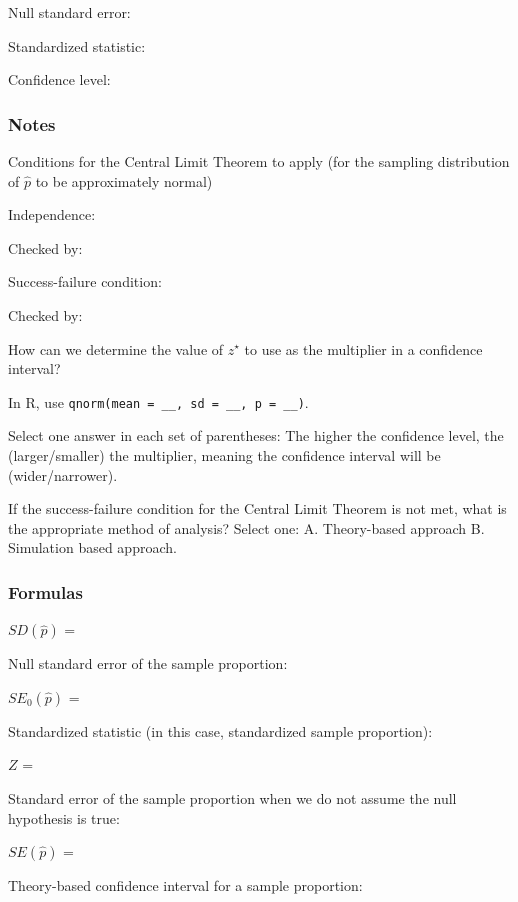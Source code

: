 \documentclass[
]{report}
\newcommand{\rgs}{\vspace{12pt}} %
\newcommand{\rgi}{\hspace{24pt}}  %
\begin{document}
Null standard error:
\rgs

Standardized statistic:
\rgs

Confidence level:
\rgs

\hypertarget{notes-18}{%
\subsubsection*{Notes}\label{notes-18}}

Conditions for the Central Limit Theorem to apply (for the sampling distribution of \(\hat{p}\) to be approximately normal)

\rgi Independence:
\rgs

\rgi \rgi Checked by:
\rgs

\rgi Success-failure condition:
\rgs

\rgi \rgi Checked by:
\rgs

How can we determine the value of \(z^⋆\) to use as the multiplier in a confidence interval?
\rgs

\rgi In R, use \texttt{qnorm(mean\ =\ \_\_,\ sd\ =\ \_\_,\ p\ =\ \_\_)}.

Select one answer in each set of parentheses: The higher the confidence level, the (larger/smaller) the multiplier, meaning the confidence interval will be (wider/narrower).

If the success-failure condition for the Central Limit Theorem is not met, what is the appropriate method of analysis? Select one:
\rgi A. Theory-based approach
\rgi B. Simulation based approach.

\hypertarget{formulas-1}{%
\subsubsection*{Formulas}\label{formulas-1}}

\(SD(\hat{p})\) =
\rgs

Null standard error of the sample proportion:

\(SE_0(\hat{p})\) =
\rgs

Standardized statistic (in this case, standardized sample proportion):

\(Z\) =
\rgs

Standard error of the sample proportion when we do not assume the null hypothesis is true:

\(SE(\hat{p})\) =
\rgs

Theory-based confidence interval for a sample proportion:
\rgs
\end{document}
